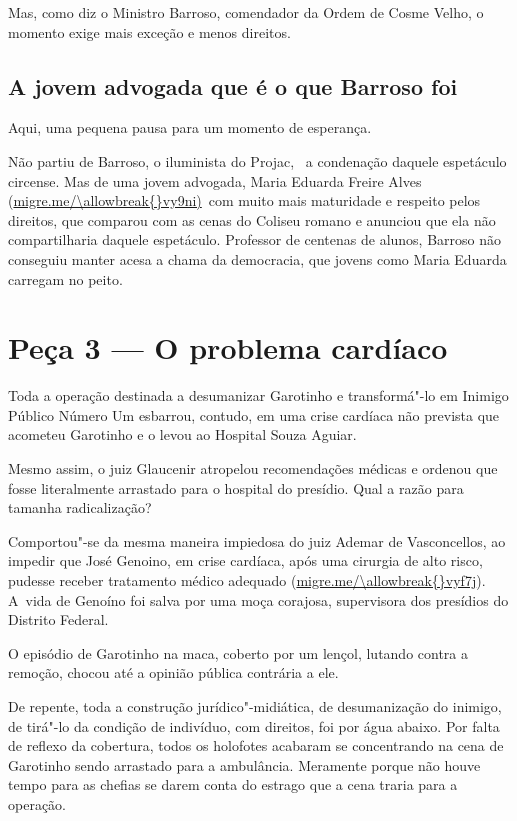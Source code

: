 Mas, como diz o Ministro Barroso, comendador da Ordem de Cosme Velho, o
momento exige mais exceção e menos direitos.

\subsection{A jovem advogada que é o que Barroso foi}

 

Aqui, uma pequena pausa para um momento de esperança.

Não partiu de Barroso, o iluminista do Projac,~ a condenação daquele
espetáculo circense. Mas de uma jovem advogada, Maria Eduarda Freire
Alves (\url{migre.me/\allowbreak{}vy9ni)}~com muito mais maturidade e respeito
pelos direitos, que comparou com as cenas do Coliseu romano e anunciou
que ela não compartilharia daquele espetáculo. Professor de centenas de
alunos, Barroso não conseguiu manter acesa a chama da democracia, que
jovens como Maria Eduarda carregam no peito.

\section{Peça 3 --- O problema cardíaco}

 

Toda a operação destinada a desumanizar Garotinho e transformá"-lo em
Inimigo Público Número Um esbarrou, contudo, em uma crise cardíaca não
prevista que acometeu Garotinho e o levou ao Hospital Souza Aguiar.

Mesmo assim, o juiz Glaucenir atropelou recomendações médicas e ordenou
que fosse literalmente arrastado para o hospital do presídio. Qual a
razão para tamanha radicalização?

Comportou"-se da mesma maneira impiedosa do juiz Ademar de Vasconcellos,
ao impedir que José Genoino, em crise cardíaca, após uma cirurgia de
alto risco, pudesse receber tratamento médico adequado
(\url{migre.me/\allowbreak{}vyf7j}). A~vida de Genoíno foi salva por uma moça
corajosa, supervisora dos presídios do Distrito Federal.

O episódio de Garotinho na maca, coberto por um lençol, lutando contra a
remoção, chocou até a opinião pública contrária a ele.

De repente, toda a construção jurídico"-midiática, de desumanização do
inimigo, de tirá"-lo da condição de indivíduo, com direitos, foi por
 água abaixo. Por falta de reflexo da cobertura, todos os holofotes
acabaram se concentrando na cena de Garotinho sendo arrastado para a
ambulância. Meramente porque não houve tempo para as chefias se darem
conta do estrago que a cena traria para a operação.


